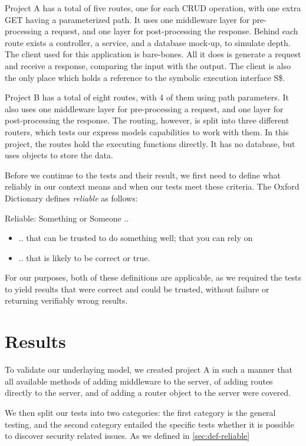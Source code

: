 Project A has a total of five routes, one for each CRUD operation, with one extra GET having a parameterized path.
It uses one middleware layer for pre-processing a request, and one layer for post-processing the response. Behind each route exists a controller, a service, and a database mock-up, to simulate depth. 
The client used for this application is bare-bones. All it does is generate a request and receive a response, comparing the input with the output. The client is also the only place which holds a reference to the symbolic execution interface S\$.

Project B has a total of eight routes, with 4 of them using path parameters.
It also uses one middleware layer for pre-processing a request, and one layer for post-processing the response. The routing, however, is split into three different routers, which tests our express models capabilities to work with them. In this project, the routes hold the executing functions directly. It has no database, but uses objects to store the data.

Before we continue to the tests and their result, we first need to define what reliably in our context means and when our tests meet these criteria.
The Oxford Dictionary defines \textit{reliable} as follows:
\begin{definition}
Reliable:  Something or Someone .. 
  \begin{itemize}
    \item .. that can be trusted to do something well; that you can rely on
    \item .. that is likely to be correct or true.
  \end{itemize}
\end{definition}
\label{sec:def-reliable}
For our purposes, both of these definitions are applicable, as we required the tests to yield results that were correct and could be trusted, without failure or returning verifiably wrong results.

\section{Results}
\label{sec:results}

To validate our underlaying model, we created project A in such a manner that all available methods of adding middleware to the server, of adding routes directly to the server, and of adding a router object to the server were covered. 

We then split our tests into two categories: the first category is the general testing, and the second category entailed the specific tests whether it is possible to discover security related issues.
As we defined in \autoref{sec:def-reliable}


